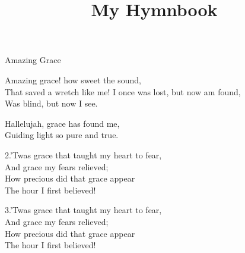\documentclass[12pt]{article}
\title{My Hymnbook}
\author{}
\date{}
\begin{document}
\maketitle
\newpage

\begin{hymn}{1}{Amazing Grace}

\begin{stanza}
Amazing grace! how sweet the sound,\\
That saved a wretch like me!
I once was lost, but now am found,\\
Was blind, but now I see.
\end{stanza}

\begin{chorus}
Hallelujah, grace has found me,\\
Guiding light so pure and true.
\end{chorus}

\begin{stanza}
2.’Twas grace that taught my heart to fear,\\
And grace my fears relieved;\\
How precious did that grace appear\\
The hour I first believed!
\end{stanza}

\begin{stanza}
3.’Twas grace that taught my heart to fear,\\
And grace my fears relieved;\\
How precious did that grace appear\\
The hour I first believed!
\end{stanza}
\end{hymn}
\end{document}
